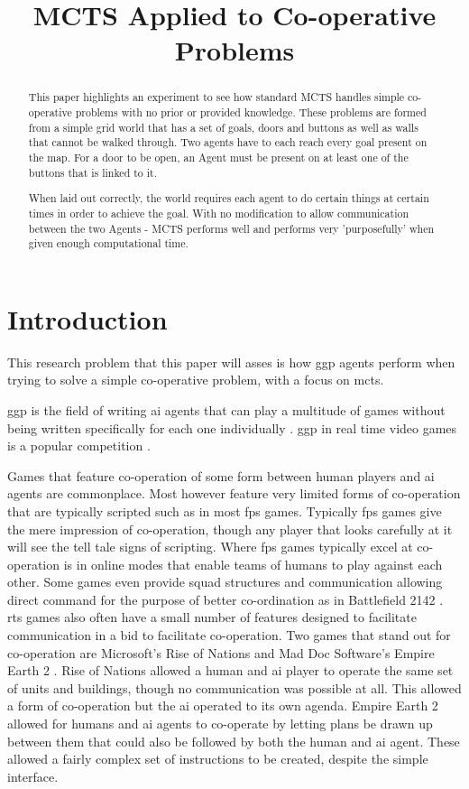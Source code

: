 \documentclass{IEEEtran}
\title{MCTS Applied to Co-operative Problems}
\begin{document}
\maketitle
\begin{abstract}
This paper highlights an experiment to see how standard MCTS handles simple co-operative problems with no prior or provided knowledge. These problems are formed from a simple grid world that has a set of goals, doors and buttons as well as walls that cannot be walked through. Two agents have to each reach every goal present on the map. For a door to be open, an Agent must be present on at least one of the buttons that is linked to it.

When laid out correctly, the world requires each agent to do certain things at certain times in order to achieve the goal. With no modification to allow communication between the two Agents - MCTS performs well and performs very 'purposefully' when given enough computational time.
\end{abstract}

\section{Introduction}
This research problem that this paper will asses is how \gls{ggp} agents perform when trying to solve a simple co-operative problem, with a focus on \gls{mcts}.

\gls{ggp} is the field of writing \gls{ai} agents that can play a multitude of games without being written specifically for each one individually \cite{genesereth2005general}. \gls{ggp} in real time video games is a popular competition \cite{perez2014}.

Games that feature co-operation of some form between human players and \gls{ai} agents are commonplace. Most however feature very limited forms of co-operation that are typically scripted such as in most \gls{fps} games. Typically \gls{fps} games give the mere impression of co-operation, though any player that looks carefully at it will see the tell tale signs of scripting. Where \gls{fps} games typically excel at co-operation is in online modes that enable teams of humans to play against each other. Some games even provide squad structures and communication allowing direct command for the purpose of better co-ordination as in Battlefield 2142 \cite{battlefield2142}. \gls{rts} games also often have a small number of features designed to facilitate communication in a bid to facilitate co-operation. Two games that stand out for co-operation are Microsoft's Rise of Nations \cite{riseofnations} and Mad Doc Software's Empire Earth 2 \cite{empireEarth2}. Rise of Nations allowed a human and \gls{ai} player to operate the same set of units and buildings, though no communication was possible at all. This allowed a form of co-operation but the \gls{ai} operated to its own agenda. Empire Earth 2 allowed for humans and \gls{ai} agents to co-operate by letting plans be drawn up between them that could also be followed by both the human and \gls{ai} agent. These allowed a fairly complex set of instructions to be created, despite the simple interface. 
\end{document}
